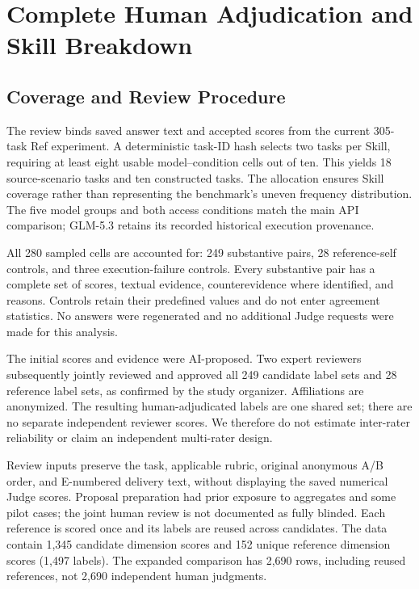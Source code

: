 \section{Complete Human Adjudication and Skill Breakdown}
\label{app:human}

\subsection{Coverage and Review Procedure}

The review binds saved answer text and accepted scores from the current
305-task Ref experiment. A deterministic task-ID hash selects two tasks per
Skill, requiring at least eight usable model--condition cells out of ten.
This yields 18 source-scenario tasks and ten constructed tasks. The allocation
ensures Skill coverage rather than representing the benchmark's uneven
frequency distribution. The five model groups and both access conditions
match the main API comparison; GLM-5.3 retains its recorded historical
execution provenance.

All 280 sampled cells are accounted for: 249 substantive pairs, 28
reference-self controls, and three execution-failure controls. Every
substantive pair has a complete set of scores, textual evidence,
counterevidence where identified, and reasons. Controls retain their
predefined values and do not enter agreement statistics. No answers were
regenerated and no additional Judge requests were made for this analysis.

The initial scores and evidence were AI-proposed. Two expert reviewers
subsequently jointly reviewed and approved all 249 candidate label sets and
28 reference label sets, as confirmed by the study organizer. Affiliations
are anonymized. The resulting human-adjudicated labels are one shared set;
there are no separate independent reviewer scores. We therefore do not
estimate inter-rater reliability or claim an independent multi-rater design.

Review inputs preserve the task, applicable rubric, original anonymous A/B
order, and E-numbered delivery text, without displaying the saved numerical
Judge scores. Proposal preparation had prior exposure to aggregates and
some pilot cases; the joint human review is not documented as fully blinded.
Each reference is scored once and its labels are reused across candidates.
The data contain 1,345 candidate dimension scores and 152 unique reference
dimension scores (1,497 labels). The expanded comparison has 2,690 rows,
including reused references, not 2,690 independent human judgments.

